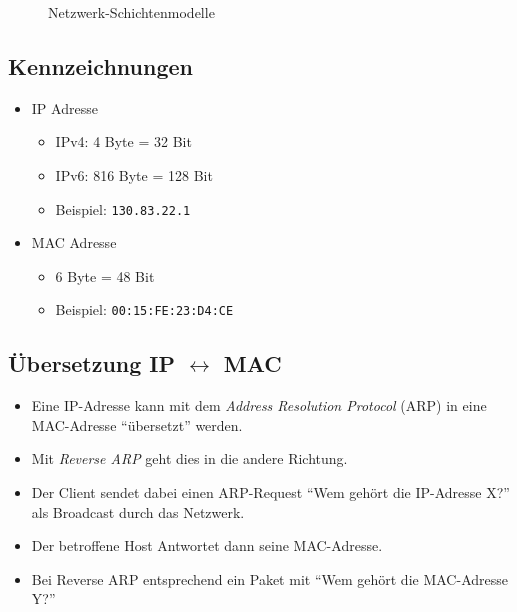 \begin{figure}[H]
				\caption{Netzwerk-Schichtenmodelle}
			\end{figure}

		\subsection{Kennzeichnungen}
			\begin{itemize}
				\item IP Adresse
					\begin{itemize}
						\item IPv4: 4 Byte = 32 Bit
						\item IPv6: 816 Byte = 128 Bit
						\item Beispiel: \texttt{130.83.22.1}
					\end{itemize}
				\item MAC Adresse
					\begin{itemize}
						\item 6 Byte = 48 Bit
						\item Beispiel: \texttt{00:15:FE:23:D4:CE}
					\end{itemize}
			\end{itemize}

		\subsection{Übersetzung IP \(\leftrightarrow\) MAC}
			\begin{itemize}
				\item Eine IP-Adresse kann mit dem \textit{Address Resolution Protocol} (ARP) in eine MAC-Adresse \enquote{übersetzt} werden.
				\item Mit \textit{Reverse ARP} geht dies in die andere Richtung.
				\item Der Client sendet dabei einen ARP-Request \enquote{Wem gehört die IP-Adresse X?} als Broadcast durch das Netzwerk.
				\item Der betroffene Host Antwortet dann seine MAC-Adresse.
				\item Bei Reverse ARP entsprechend ein Paket mit \enquote{Wem gehört die MAC-Adresse Y?}
			\end{itemize}

